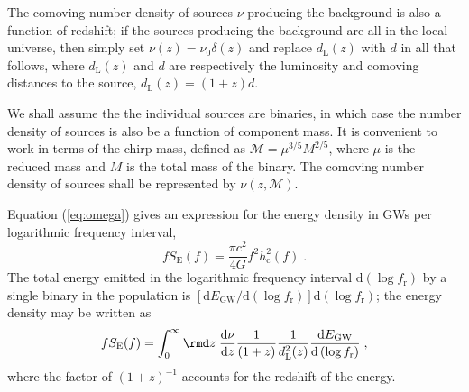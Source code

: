 The comoving number density of sources $\nu$ producing the background is also a function of redshift; if the sources producing the background are all in the local universe, then simply set $\nu(z) = \nu_0\delta (z)$ and replace $d_{\mathrm{L}}(z)$ with $d$ in all that follows, where $d_{\mathrm{L}}(z)$ and $d$ are respectively the luminosity and comoving distances to the source, $d_{\mathrm{L}}(z)=(1+z)d$.

We shall assume the the individual sources are binaries, in which case the number density of sources is also be a function of component mass. It is convenient to work in terms of the chirp mass, defined as ${\mathcal{M}}=\mu^{3/5}M^{2/5}$, where $\mu$ is the reduced mass and $M$ is the total mass of the binary. The comoving number density of sources shall be represented by $\nu(z, \mathcal{M})$.

Equation (\ref{eq:omega}) gives an expression for the energy density in GWs per logarithmic frequency interval,
\begin{equation}\label{eq:stoch}
fS_{\mathrm{E}}(f)=\frac{\pi c^{2}}{4G}f^{2}h_\mathrm{c}^{2}(f) \; .
\end{equation}
The total energy emitted in the logarithmic frequency interval $\mathrm{d}\left(\log f_{\mathrm{r}}\right)$ by a single binary in the population is $\left[\mathrm{d}E_{\mathrm{GW}}/\mathrm{d}(\log f_{\mathrm{r}})\right]\mathrm{d}(\log f_{\mathrm{r}})$; the energy density may be written as
\begin{equation}\label{eq:Phinney}
fS_{\mathrm{E}}(f) = \int_{0}^{\infty} \rmd z\; \frac{\mathrm{d}\nu}{\mathrm{d}z}\frac{1}{(1+z)}\frac{1}{d_{\mathrm{L}}^{2}(z)}\frac{\mathrm{d}E_{\mathrm{GW}}}{\mathrm{d}\left(\log f_{\mathrm{r}} \right)} \; , \end{equation}
where the factor of $\left( 1+z \right)^{-1}$ accounts for the redshift of the energy.

